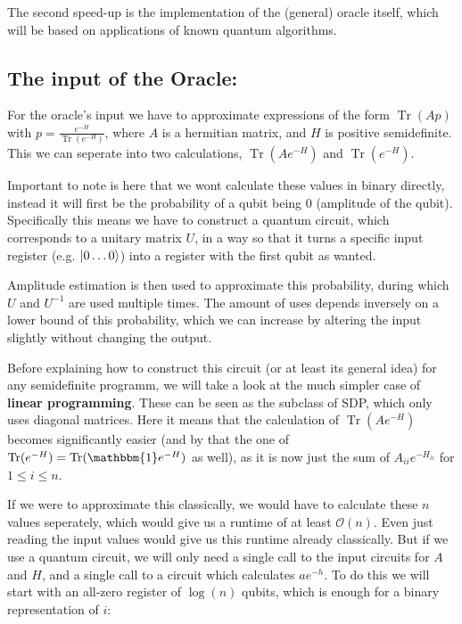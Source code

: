 \documentclass[11pt,a4paper]{scrartcl}
\DeclareMathOperator{\Tr}{Tr}
\begin{document}
The second speed-up is the implementation of the (general) oracle itself, which will be based on applications of known quantum algorithms.

\subsection{The input of the Oracle:}

For the oracle's input we have to approximate expressions of the form $\Tr(Ap)$ with $p=\frac{e^{-H}}{\Tr(e^{-H})}$, where $A$ is a hermitian matrix, and $H$ is positive semidefinite. This we can seperate into two calculations, $\Tr(Ae^{-H})$ and $\Tr(e^{-H})$.

Important to note is here that we wont calculate these values in binary directly, instead it will first be the probability of a qubit being 0 (amplitude of the qubit). Specifically this means we have to construct a quantum circuit, which corresponds to a unitary matrix $U$, in a way so that it turns a specific input register (e.g. $\ket{0\ldots 0}$) into a register with the first qubit as wanted.

Amplitude estimation is then used to approximate this probability, during which $U$ and $U^{-1}$ are used multiple times. The amount of uses depends inversely on a lower bound of this probability, which we can increase by altering the input slightly without changing the output.

\vspace{1cm}

Before explaining how to construct this circuit (or at least its general idea) for any semidefinite programm, we will take a look at the much simpler case of \textbf{linear programming}. These can be seen as the subclass of SDP, which only uses diagonal matrices. Here it means that the calculation of $\Tr(Ae^{-H})$ becomes significantly easier (and by that the one of $\Tr(e^{-H})=\Tr(\mathbbm{1}e^{-H})$ as well), as it is now just the sum of $A_{ii}e^{-H_{ii}}$ for $1\leq i\leq n$.

If we were to approximate this classically, we would have to calculate these $n$ values seperately, which would give us a runtime of at least $\mathcal{O}(n)$. Even just reading the input values would give us this runtime already classically. But if we use a quantum circuit, we will only need a single call to the input circuits for $A$ and $H$, and a single call to a circuit which calculates $ae^{-h}$. To do this we will start with an all-zero register of $\log(n)$ qubits, which is enough for a binary representation of $i$:
\end{document}
